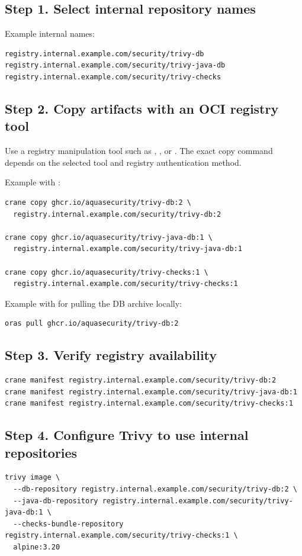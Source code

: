 \documentclass[10pt]{article}
\newcommand{\artifact}[1]{\path{#1}}
\begin{document}
\subsection{Step 1. Select internal repository names}
Example internal names:
\begin{lstlisting}[style=shell]
registry.internal.example.com/security/trivy-db
registry.internal.example.com/security/trivy-java-db
registry.internal.example.com/security/trivy-checks
\end{lstlisting}

\subsection{Step 2. Copy artifacts with an OCI registry tool}
Use a registry manipulation tool such as \artifact{crane}, \artifact{oras}, or \artifact{regctl}. The exact copy command depends on the selected tool and registry authentication method.

Example with \artifact{crane}:
\begin{lstlisting}[style=shell]
crane copy ghcr.io/aquasecurity/trivy-db:2 \
  registry.internal.example.com/security/trivy-db:2

crane copy ghcr.io/aquasecurity/trivy-java-db:1 \
  registry.internal.example.com/security/trivy-java-db:1

crane copy ghcr.io/aquasecurity/trivy-checks:1 \
  registry.internal.example.com/security/trivy-checks:1
\end{lstlisting}

Example with \artifact{oras} for pulling the DB archive locally:
\begin{lstlisting}[style=shell]
oras pull ghcr.io/aquasecurity/trivy-db:2
\end{lstlisting}

\subsection{Step 3. Verify registry availability}
\begin{lstlisting}[style=shell]
crane manifest registry.internal.example.com/security/trivy-db:2
crane manifest registry.internal.example.com/security/trivy-java-db:1
crane manifest registry.internal.example.com/security/trivy-checks:1
\end{lstlisting}

\subsection{Step 4. Configure Trivy to use internal repositories}
\begin{lstlisting}[style=shell]
trivy image \
  --db-repository registry.internal.example.com/security/trivy-db:2 \
  --java-db-repository registry.internal.example.com/security/trivy-java-db:1 \
  --checks-bundle-repository registry.internal.example.com/security/trivy-checks:1 \
  alpine:3.20
\end{lstlisting}
\end{document}
